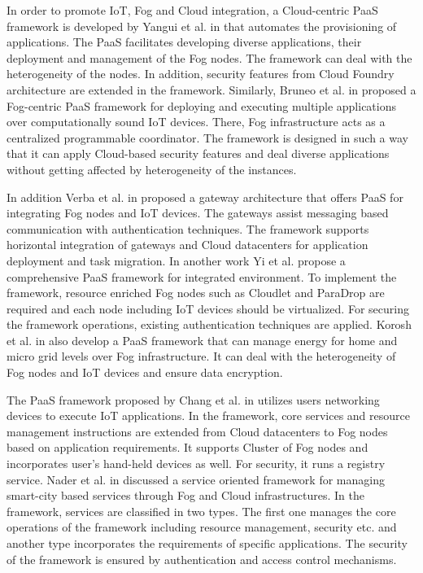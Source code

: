 \documentclass[final,5p,times,twocolumn]{elsarticle}
\begin{document}
\par In order to promote IoT, Fog and Cloud integration, a Cloud-centric PaaS framework is developed by Yangui et al. in \cite{Yangui} that automates the provisioning of applications. The PaaS facilitates developing diverse applications, their deployment and management of the Fog nodes. The framework can deal with the heterogeneity of the nodes. In addition, security features from Cloud Foundry architecture are extended in the framework. Similarly, Bruneo et al. in \cite{Bruneo} proposed a Fog-centric PaaS framework for deploying and executing multiple applications over computationally sound IoT devices. There, Fog infrastructure acts as a centralized programmable coordinator. The framework is designed in such a way that it can apply Cloud-based security features and deal diverse applications without getting affected by heterogeneity of the instances. 
%
\par In addition Verba et al. in \cite{verba} proposed a gateway architecture that offers PaaS for integrating Fog nodes and IoT devices. The gateways assist messaging based communication with authentication techniques. The framework supports horizontal integration of gateways and Cloud datacenters for application deployment and task migration. In another work Yi et al. \cite{Yi} propose a comprehensive PaaS framework for integrated environment. To implement the framework, resource enriched Fog nodes such as Cloudlet and ParaDrop are required and each node including IoT devices should be virtualized. For securing the framework operations, existing authentication techniques are applied. Korosh et al. in \cite{Korosh} also develop a PaaS framework that can manage energy for home and micro grid levels over Fog infrastructure. It can deal with the heterogeneity of Fog nodes and IoT devices and ensure data encryption.
%
\par The PaaS framework proposed by Chang et al. in \cite{Chang} utilizes users networking devices to execute IoT applications. In the framework, core services and resource management instructions are extended from Cloud datacenters to Fog nodes based on application requirements. It supports Cluster of Fog nodes and incorporates user's hand-held devices as well. For security, it runs a registry service. Nader et al. in \cite{nader} discussed a service oriented framework for managing smart-city based services through Fog and Cloud infrastructures. In the framework, services are classified in two types. The first one manages the core operations of the framework including resource management, security etc. and another type incorporates the requirements of specific applications. The security of the framework is ensured by authentication and access control mechanisms.
\end{document}
